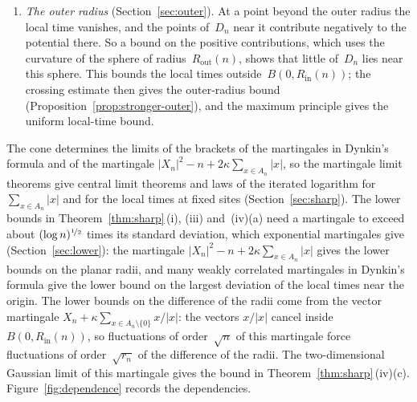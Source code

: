 \documentclass[11pt]{amsart}
\theoremstyle{plain}
\theoremstyle{definition}
\newcommand{\drift}{\kappa}
\newcommand{\nf}{\nicefrac}
\newcommand{\Rin}{R_{\mathrm{in}}}
\newcommand{\Rout}{R_{\mathrm{out}}}
\numberwithin{equation}{section}
\begin{document}
\begin{enumerate}[label=\arabic*.,leftmargin=*]
\item \emph{The outer radius} (Section~\ref{sec:outer}). At a point beyond the outer radius the local time vanishes, and the points of~$D_n$ near it contribute negatively to the potential there. So a bound on the positive contributions, which uses the curvature of the sphere of radius~$\Rout(n)$, shows that little of~$D_n$ lies near this sphere. This bounds the local times outside~$B(0,\Rin(n))$; the crossing estimate then gives the outer-radius bound (Proposition~\ref{prop:stronger-outer}), and the maximum principle gives the uniform local-time bound.
\end{enumerate}
The cone determines the limits of the brackets of the martingales in Dynkin's formula and of the martingale $|X_n|^2-n+2\drift\sum_{x\in A_n}|x|$, so the martingale limit theorems give central limit theorems and laws of the iterated logarithm for $\sum_{x\in A_n}|x|$ and for the local times at fixed sites (Section~\ref{sec:sharp}). The lower bounds in Theorem~\ref{thm:sharp}\,(i), (iii) and~(iv)(a) need a martingale to exceed about $(\log n)^{\nf12}$ times its standard deviation, which exponential martingales give (Section~\ref{sec:lower}): the martingale $|X_n|^2-n+2\drift\sum_{x\in A_n}|x|$ gives the lower bounds on the planar radii, and many weakly correlated martingales in Dynkin's formula give the lower bound on the largest deviation of the local times near the origin. The lower bounds on the difference of the radii come from the vector martingale $X_n+\drift\sum_{x\in A_n\setminus\{0\}}x/|x|$: the vectors $x/|x|$ cancel inside~$B(0,\Rin(n))$, so fluctuations of order~$\sqrt n$ of this martingale force fluctuations of order~$\sqrt{r_n}$ of the difference of the radii. The two-dimensional Gaussian limit of this martingale gives the bound in Theorem~\ref{thm:sharp}\,(iv)(c). Figure~\ref{fig:dependence} records the dependencies.
\end{document}
